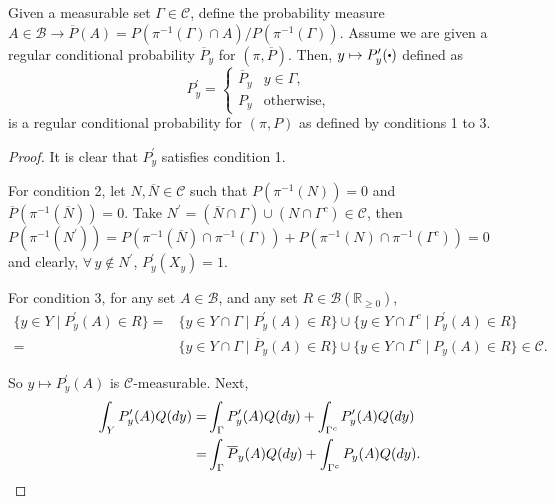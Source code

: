 \documentclass[10pt,a4paper]{amsart}
\renewcommand{\cdot}[1][.5]{%
  \mathbin{\vcenter{\hbox{\scalebox{#1}{$\bullet$}}}}%
}
\begin{document}
\begin{lemma}\label{lem:complete_diaconis}
Given a measurable set $\Gamma\in\mathcal{C}$, define the probability measure
$A\in\mathcal{B}\rightarrow\overline{P}(A)=P(\pi^{-1}(\Gamma)\cap A)/P(\pi^{-1}(\Gamma))$.
Assume we are given a regular conditional probability $\overline{P}_{y}$ for $(\pi,\overline{P})$. Then, $y\mapsto P_{y}^\prime(\cdot)$ defined
as 
\[
P_{y}^\prime=\begin{cases}
\overline{P}_{y} & y\in\Gamma,\\
P_{y} & \mathrm{otherwise,}
\end{cases}
\]
is a regular conditional probability for $(\pi,P)$ as defined by
conditions 1 to 3. 
\end{lemma}

\begin{proof}
It is clear that $P_{y}^\prime$ satisfies condition 1. 

For condition 2, let $N,\overline{N}\in\mathcal{C}$ such that $P(\pi^{-1}(N))=0$
and $\overline{P}(\pi^{-1}(\overline{N}))=0$. Take $N^\prime=(\overline{N}\cap\Gamma)\cup(N\cap\Gamma^{c})\in\mathcal{C}$,
then $P(\pi^{-1}(N^\prime))= P(\pi^{-1}(\overline{N})\cap\pi^{-1}(\Gamma))+P(\pi^{-1}(N)\cap\pi^{-1}(\Gamma^{c}))=0$
and clearly, $\forall\,y\notin N^\prime$, $P_{y}^\prime(X_{y})=1$.

For condition 3, for any set $A\in\mathcal{B}$, and any set $R\in \mathcal{B}(\mathbb{R}_{\geq 0})$,
\begin{align*}
\{y\in Y \mid P_{y}^\prime(A)\in R\}= & \{y\in Y \cap \Gamma \mid P_{y}^\prime(A)\in R\}\cup \{y\in Y \cap \Gamma^c \mid P_{y}^\prime(A)\in R\}\\
= & \{y\in Y\cap\Gamma \mid \overline{P}_{y}(A)\in R\} \cup \{y\in Y\cap\Gamma^{c} \mid P_{y}(A)\in R\} \in\mathcal{C}.
\end{align*}

So $y\mapsto P_{y}^\prime(A)$ is $\mathcal{C}$-measurable. Next,
\begin{align*}
\int_{Y}P_{y}^\prime(A)Q({\rm d}y)= & \int_{\Gamma}P_{y}^\prime(A)Q({\rm d}y)+\int_{\Gamma^{c}}P_{y}^\prime(A)Q({\rm d}y)\\
= & \int_{\Gamma}\overline{P}_{y}(A)Q({\rm d}y)+\int_{\Gamma^{c}}P_{y}(A)Q({\rm d}y).
\end{align*}


\end{proof}
\end{document}
